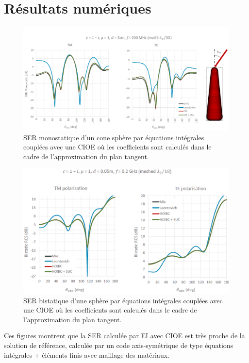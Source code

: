 \section{Résultats numériques}

  \begin{figure}[!hbt]
    \centering
    \includegraphics[width=\textwidth]{images/ser/cone_sphere_mono.png}
    \caption{SER monostatique d'un cone sphère par équations intégrales couplées avec une CIOE où les coefficients sont calculés dans le cadre de l'approximation du plan tangent.}
    \label{fig:ser:cone-sphere-mono-M1}
  \end{figure}


  \begin{figure}[!hbt]
    \centering
    \includegraphics[width=\textwidth]{images/ser/sphere_bis.png}
    \caption{SER bistatique d'une sphère par équations intégrales couplées avec une CIOE où les coefficients sont calculés dans le cadre de l'approximation du plan tangent.}
    \label{fig:ser:sphere-bis-M1}
  \end{figure}

  Ces figures montrent que la SER calculée par EI avec CIOE est très proche de la solution de référence, calculée par un code axis-symétrique de type équations intégrales + éléments finis avec maillage des matériaux.